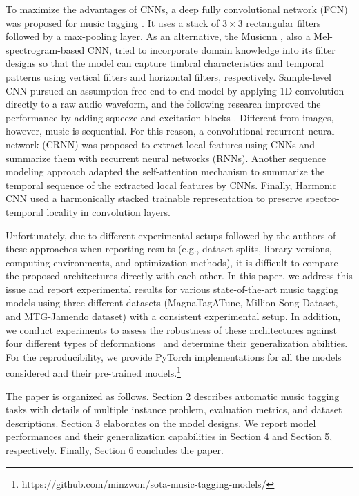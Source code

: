 \documentclass{article}
\begin{document}
To maximize the advantages of CNNs, a deep fully convolutional network (FCN) was proposed for music tagging \cite{choi2016automatic}. It uses a stack of $3 \times 3$ rectangular filters followed by a max-pooling layer.
As an alternative, the Musicnn \cite{pons2018end}, also a Mel-spectrogram-based CNN, tried to incorporate domain knowledge into its filter designs so that the model can capture timbral characteristics and temporal patterns using vertical filters and horizontal filters, respectively. Sample-level CNN \cite{lee2017sample} pursued an assumption-free end-to-end model by applying 1D convolution directly to a raw audio waveform, and the following research \cite{kim2018sample} improved the performance by adding squeeze-and-excitation blocks \cite{hu2018squeeze}. Different from images, however, music is sequential. For this reason, a convolutional recurrent neural network (CRNN) \cite{choi2017convolutional} was proposed to extract local features using CNNs and summarize them with recurrent neural networks (RNNs). Another sequence modeling approach \cite{won2019toward} adapted the self-attention mechanism \cite{devlin2018bert} to summarize the temporal sequence of the extracted local features by CNNs. Finally, Harmonic CNN \cite{won2020data} used a harmonically stacked trainable representation to preserve spectro-temporal locality in convolution layers.

Unfortunately, due to different experimental setups followed by the authors of these approaches when reporting results (e.g., dataset splits, library versions, computing environments, and optimization methods), it is difficult to compare the proposed architectures directly with each other. In this paper, we address this issue and report experimental results for various state-of-the-art music tagging models using three different datasets (MagnaTagATune, Million Song Dataset, and MTG-Jamendo dataset) with a consistent experimental setup. In addition, we conduct experiments to assess the robustness of these architectures against four different types of deformations~\cite{mcfee2015software} and determine their generalization abilities. For the reproducibility, we provide PyTorch implementations for all the models considered and their pre-trained models.\footnote{https://github.com/minzwon/sota-music-tagging-models/}

The paper is organized as follows. Section 2 describes automatic music tagging tasks with details of multiple instance problem, evaluation metrics, and dataset descriptions. Section 3 elaborates on the model designs. We report model performances and their generalization capabilities in Section 4 and Section 5, respectively. Finally, Section 6 concludes the paper.
\end{document}
